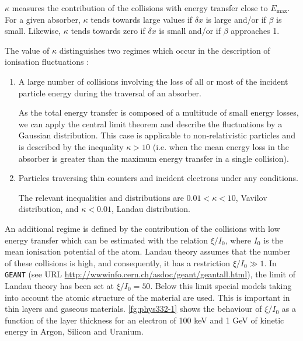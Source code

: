 \documentclass{article}
\newcommand{\Emax}{\ensuremath{E_{\mathrm{max}}}}
\newcommand{\GEANT}{\texttt{GEANT}}
\begin{document}
$\kappa$ measures the contribution of the collisions with energy
transfer close to \Emax.  For a given absorber, $\kappa$ tends
towards large values if $\delta x$ is large and/or if $\beta$ is
small.  Likewise, $\kappa$ tends towards zero if $\delta x $ is small
and/or if $\beta$ approaches 1.

The value of $\kappa$ distinguishes two regimes which occur in the
description of ionisation fluctuations :
 
\begin{enumerate}
\item A large number of collisions involving the loss of all or most
  of the incident particle energy during the traversal of an absorber.
  
  As the total energy transfer is composed of a multitude of small
  energy losses, we can apply the central limit theorem and describe
  the fluctuations by a Gaussian distribution.  This case is
  applicable to non-relativistic particles and is described by the
  inequality $\kappa > 10 $ (i.e. when the mean energy loss in the
  absorber is greater than the maximum energy transfer in a single
  collision).
  
\item Particles traversing thin counters and incident electrons under
  any conditions.
  
  The relevant inequalities and distributions are $ 0.01 < \kappa < 10
  $, Vavilov distribution, and $\kappa < 0.01 $, Landau distribution.
\end{enumerate}

An additional regime is defined by the contribution of the collisions
with low energy transfer which can be estimated with the relation
$\xi/I_0$, where $I_0$ is the mean ionisation potential of the atom.
Landau theory assumes that the number of these collisions is high, and
consequently, it has a restriction $\xi/I_0 \gg 1$.  In \GEANT{}
(see URL \url{http://wwwinfo.cern.ch/asdoc/geant/geantall.html}), the
limit of Landau theory has been set at $\xi/I_0 = 50$.  Below this
limit special models taking into account the atomic structure of the
material are used.  This is important in thin layers and gaseous
materials.  \autoref{fg:phys332-1} shows the behaviour of $\xi/I_0$
as a function of the layer thickness for an electron of 100 keV and 1
GeV of kinetic energy in Argon, Silicon and Uranium.
\end{document}
